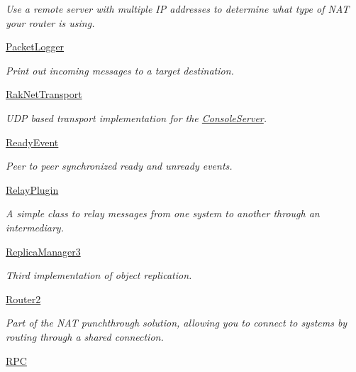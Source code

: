 \begin{DoxyCompactItemize}
\begin{DoxyCompactList}\small\item\em Use a remote server with multiple I\-P addresses to determine what type of N\-A\-T your router is using. \end{DoxyCompactList}\item 
\hyperlink{group___p_a_c_k_e_t_l_o_g_g_e_r___g_r_o_u_p}{Packet\-Logger}
\begin{DoxyCompactList}\small\item\em Print out incoming messages to a target destination. \end{DoxyCompactList}\item 
\hyperlink{group___r_a_k_n_e_t___t_r_a_n_s_p_o_r_t___g_r_o_u_p}{Rak\-Net\-Transport}
\begin{DoxyCompactList}\small\item\em U\-D\-P based transport implementation for the \hyperlink{class_rak_net_1_1_console_server}{Console\-Server}. \end{DoxyCompactList}\item 
\hyperlink{group___r_e_a_d_y___e_v_e_n_t___g_r_o_u_p}{Ready\-Event}
\begin{DoxyCompactList}\small\item\em Peer to peer synchronized ready and unready events. \end{DoxyCompactList}\item 
\hyperlink{group___r_e_l_a_y___p_l_u_g_i_n___g_r_o_u_p}{Relay\-Plugin}
\begin{DoxyCompactList}\small\item\em A simple class to relay messages from one system to another through an intermediary. \end{DoxyCompactList}\item 
\hyperlink{group___r_e_p_l_i_c_a___m_a_n_a_g_e_r___g_r_o_u_p3}{Replica\-Manager3}
\begin{DoxyCompactList}\small\item\em Third implementation of object replication. \end{DoxyCompactList}\item 
\hyperlink{group___r_o_u_t_e_r__2___g_r_o_u_p}{Router2}
\begin{DoxyCompactList}\small\item\em Part of the N\-A\-T punchthrough solution, allowing you to connect to systems by routing through a shared connection. \end{DoxyCompactList}\item 
\hyperlink{group___r_p_c___p_l_u_g_i_n___g_r_o_u_p}{R\-P\-C}

\end{DoxyCompactItemize}
